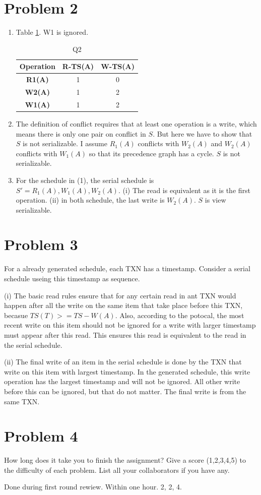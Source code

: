 \documentclass{article}
\begin{document}
\section*{Problem 2}
\begin{enumerate}
	\item Table \ref{table:2}. W1 is ignored.
	\begin{table}[h!]
		\centering
		\begin{tabular}{|c|c|c|}
		\hline
		\textbf{Operation} & \textbf{R-TS(A)} & \textbf{W-TS(A)} \\ \hline
		\textbf{R1(A)}     & 1       & 0       \\ \hline
		\textbf{W2(A)}     & 1       & 2       \\ \hline
		\textbf{W1(A)}     & 1       & 2       \\ \hline
		\end{tabular}
		\caption{Q2}
		\label{table:2}
	\end{table}

	\item The definition of conflict requires that at least one operation is a write, which means there is only one pair on conflict in $S$. But here we have to show that $S$ is not serializable. I assume $R_1 (A)$ conflicts with $W_2 (A)$ and $W_2 (A)$ conflicts with $W_1 (A)$ so that its precedence graph has a cycle. $S$ is not serializable.
	\item For the schedule in (1), the serial schedule is $S' = R_1 (A),W_1 (A),W_2 (A)$. (i) The read is equivalent as it is the first operation. (ii) in both schedule, the last write is $W_2 (A)$. $S$ is view serializable.
\end{enumerate}

\section*{Problem 3}
For a already generated schedule, each TXN has a timestamp. Consider a serial schedule useing this timestamp as sequence.

(i) The basic read rules ensure that for any certain read in ant TXN would happen after all the write on the same item that take place before this TXN, becasue $TS(T)>=TS-W(A)$. Also, according to the potocal, the most recent write on this item should not be ignored for a write with larger timestamp must appear after this read. This ensures this read is equivalent to the read in the serial schedule.

(ii) The final write of an item in the serial schedule is done by the TXN that write on this item with largest timestamp. In the generated schedule, this write operation has the largest timestamp and will not be ignored. All other write before this can be ignored, but that do not matter. The final write is from the same TXN. 

\section*{Problem 4}
\begin{tcolorbox}[colback=gray!10, breakable]
	How long does it take you to finish the assignment? Give a score (1,2,3,4,5) to the difficulty of each problem. List all your collaborators if you have any.
\end{tcolorbox}
Done during first round rewiew. Within one hour. 2, 2, 4.
\end{document}
